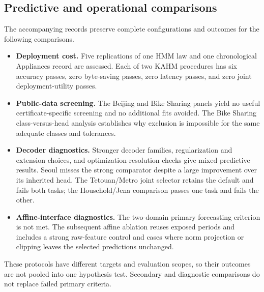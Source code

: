 \subsection{Predictive and operational comparisons}
The accompanying records preserve complete configurations and outcomes for the following comparisons.
\begin{itemize}[leftmargin=*,itemsep=2pt]
\item \textbf{Deployment cost.} Five replications of one HMM law and one chronological Appliances record are assessed. Each of two KAHM procedures has six accuracy passes, zero byte-saving passes, zero latency passes, and zero joint deployment-utility passes.
\item \textbf{Public-data screening.} The Beijing and Bike Sharing panels yield no useful certificate-specific screening and no additional fits avoided. The Bike Sharing class-versus-head analysis establishes why exclusion is impossible for the same adequate classes and tolerances.
\item \textbf{Decoder diagnostics.} Stronger decoder families, regularization and extension choices, and optimization-resolution checks give mixed predictive results. Seoul \citep{uci2020seoul} misses the strong comparator despite a large improvement over its inherited head. The Tetouan/Metro joint selector \citep{salam2018tetouan,hogue2019metro} retains the default and fails both tasks; the Household/Jena comparison passes one task and fails the other.
\item \textbf{Affine-interface diagnostics.} The two-domain primary forecasting criterion is not met. The subsequent affine ablation reuses exposed periods and includes a strong raw-feature control and cases where norm projection or clipping leaves the selected predictions unchanged.
\end{itemize}
These protocols have different targets and evaluation scopes, so their outcomes are not pooled into one hypothesis test. Secondary and diagnostic comparisons do not replace failed primary criteria.
